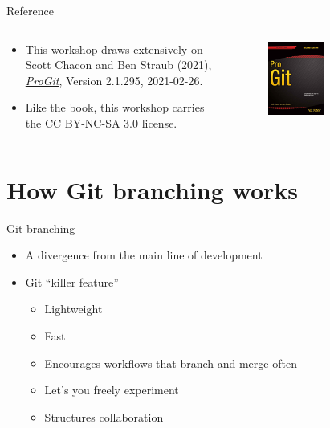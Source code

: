 \documentclass[handout]{beamer}
\begin{document}
\begin{frame}{Reference}
	\begin{columns}
	
		\begin{column}{0.5\textwidth}
			\begin{itemize}
				\item This workshop draws extensively on Scott Chacon and Ben Straub (2021), \href{https://git-scm.com/book/en/v2}{\textit{ProGit}}, Version 2.1.295, 2021-02-26. 
				\item Like the book, this workshop carries the CC BY-NC-SA 3.0 license.
			\end{itemize}
		\end{column}
		
		\begin{column}{0.5\textwidth}
			\begin{figure}
				\includegraphics[width=0.5\textwidth]{figures/progit_cover.png}
				\caption{}
			\end{figure}
		\end{column}
	
	\end{columns}
\end{frame}


\section{How Git branching works}

\begin{frame}{Git branching}
	\begin{itemize}
		\item A divergence from the main line of development
		\item Git “killer feature”
		\begin{itemize}
			\item Lightweight
			\item Fast
			\item Encourages workflows that branch and merge often
			\item Let's you freely experiment
			\item Structures collaboration
		\end{itemize}
	\end{itemize}
\end{frame}
	
\end{document}
